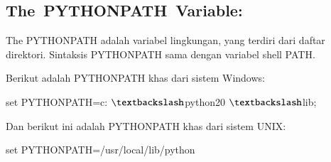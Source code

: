 \documentclass[a4paper,12pt]{report}
\begin{document}
\subsection*{The PYTHONPATH Variable:}
 \par
\begin{adjustwidth}{0.03in}{0.03in}
The PYTHONPATH adalah variabel lingkungan, yang terdiri dari daftar direktori. Sintaksis PYTHONPATH sama dengan variabel shell PATH.\end{adjustwidth}
 \par
\begin{adjustwidth}{0.03in}{0.03in}
Berikut adalah PYTHONPATH khas dari sistem Windows:\end{adjustwidth}
 \par
\noindent 
 \hspace*{0.5in} set PYTHONPATH=c: $  \textbackslash  $python20 $  \textbackslash  $lib; \par
\begin{adjustwidth}{0.03in}{0.03in}
Dan berikut ini adalah PYTHONPATH khas dari sistem UNIX:\end{adjustwidth}
 \par
\noindent 
 \hspace*{0.5in} set PYTHONPATH=/usr/local/lib/python \par
\vspace{20pt}
\end{document}
